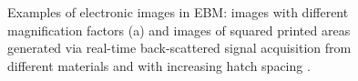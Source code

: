 \begin{figure}
    \centering
    \qquad
    \caption[Co-axial sensing result.]{Examples of electronic images in EBM: images with different magnification factors (a) \cite{wong_pilot_2019} and images of squared printed areas generated via real-time back-scattered signal acquisition from different materials and with increasing hatch spacing \cite{arnold_operando_2020}.}
\end{figure}
